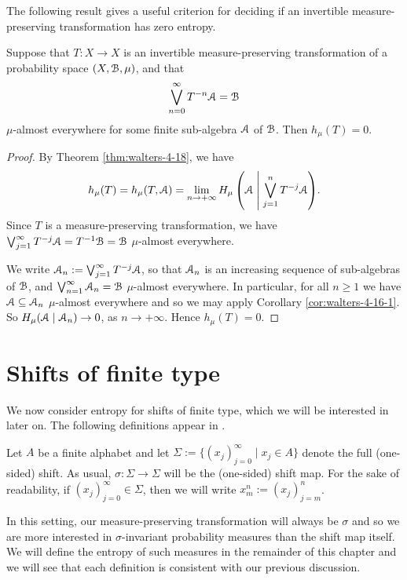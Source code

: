 The following result gives a useful criterion for deciding if an invertible measure-preserving transformation has zero entropy.

\begin{corollary}
	Suppose that $T : X \to X$ is an invertible measure-preserving transformation of a probability space $(X, \mathcal{B}, \mu)$, and that
	\[
		\bigvee_{n = 0}^\infty{T^{-n}{\mathcal{A}}} = \mathcal{B}
	\]
	$\mu$-almost everywhere for some finite sub-algebra $\mathcal{A}$ of $\mathcal{B}$. Then $h_\mu(T) = 0$.
	
	\begin{proof}
		By Theorem \ref{thm:walters-4-18}, we have
		\[
			h_\mu(T) = h_\mu(T, \mathcal{A}) = \lim_{n \to +\infty}{H_\mu\left(\mathcal{A} \mathrel{}\middle|\mathrel{} \bigvee_{j = 1}^n{T^{-j}{\mathcal{A}}}\right)}.
		\]
		Since $T$ is a measure-preserving transformation, we have $\bigvee_{j = 1}^\infty{T^{-j}{\mathcal{A}}} = T^{-1}{\mathcal{B}} = \mathcal{B}$ $\mu$-almost everywhere.
		
		We write $\mathcal{A}_n := \bigvee_{j = 1}^\infty{T^{-j}{\mathcal{A}}}$, so that $\mathcal{A}_n$ is an increasing sequence of sub-algebras of $\mathcal{B}$, and $\bigvee_{n = 1}^\infty{\mathcal{A}_n} = \mathcal{B}$ $\mu$-almost everywhere. In particular, for all $n \geq 1$ we have $\mathcal{A} \subseteq \mathcal{A}_n$ $\mu$-almost everywhere and so we may apply Corollary \ref{cor:walters-4-16-1}. So $H_\mu(\mathcal{A} \mid \mathcal{A}_n) \to 0$, as $n \to +\infty$. Hence $h_\mu(T) = 0$.
	\end{proof}
\end{corollary}

\section{Shifts of finite type} \label{sec:entropy:sft}
We now consider entropy for shifts of finite type, which we will be interested in later on. The following definitions appear in \cite{chazottes-maldonado:cbfee}.

Let $A$ be a finite alphabet and let $\Sigma := \{(x_j)_{j = 0}^\infty \mid x_j \in A\}$ denote the full (one-sided) shift. As usual, $\sigma : \Sigma \to \Sigma$ will be the (one-sided) shift map. For the sake of readability, if $(x_j)_{j = 0}^\infty \in \Sigma$, then we will write $x_m^n := (x_j)_{j = m}^n$.

In this setting, our measure-preserving transformation will always be $\sigma$ and so we are more interested in $\sigma$-invariant probability measures than the shift map itself. We will define the entropy of such measures in the remainder of this chapter and we will see that each definition is consistent with our previous discussion.


